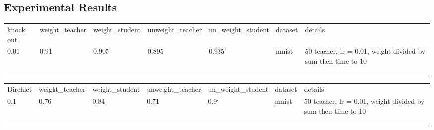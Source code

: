 \documentclass{article}
\theoremstyle{definition}
\begin{document}
\subsection{Experimental Results}
\begin{table}[]
\begin{tabular}{lllllll}
knock out              & weight\_teacher & weight\_student & unweight\_teacher & un\_weight\_student & dataset & details                                                      \\
 0.01 & 0.91            & 0.905           & 0.895             & 0.935               & mnist   & 50 teacher, lr = 0.01, weight divided by sum then time to 10 \\
                    &                 &                 &                   &                     &         &                                                              \\
                    &                 &                 &                   &                     &         &                                                              \\
                    &                 &                 &                   &                     &         &                                                             
\end{tabular}
\end{table}
\begin{table}[]
\begin{tabular}{lllllll}
Dirchlet           & weight\_teacher & weight\_student & unweight\_teacher & un\_weight\_student & dataset & details                                                      \\
 0.1 & 0.76           & 0.84           & 0.71          & 0.9`             & mnist   & 50 teacher, lr = 0.01, weight divided by sum then time to 10 \\
                    &                 &                 &                   &                     &         &                                                              \\
                    &                 &                 &                   &                     &         &                                                              \\
                    &                 &                 &                   &                     &         &                                                             
\end{tabular}
\end{table}
\end{document}

